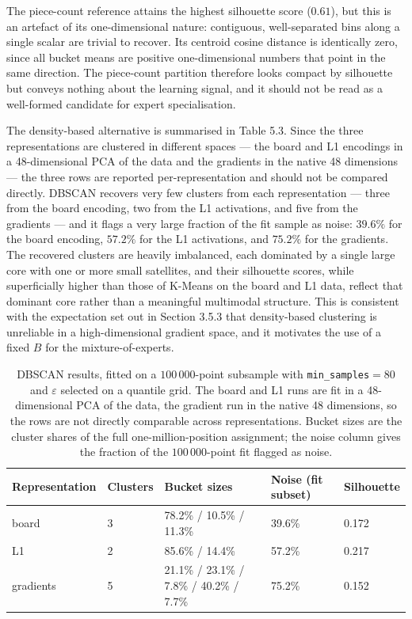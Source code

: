 The piece-count reference attains the highest silhouette score ($0.61$), but this is an artefact of its one-dimensional nature: contiguous, well-separated bins along a single scalar are trivial to recover. Its centroid cosine distance is identically zero, since all bucket means are positive one-dimensional numbers that point in the same direction. The piece-count partition therefore looks compact by silhouette but conveys nothing about the learning signal, and it should not be read as a well-formed candidate for expert specialisation.

The density-based alternative is summarised in Table 5.3. Since the three representations are clustered in different spaces --- the board and L1 encodings in a 48-dimensional PCA of the data and the gradients in the native 48 dimensions --- the three rows are reported per-representation and should not be compared directly. DBSCAN recovers very few clusters from each representation --- three from the board encoding, two from the L1 activations, and five from the gradients --- and it flags a very large fraction of the fit sample as noise: $39.6\%$ for the board encoding, $57.2\%$ for the L1 activations, and $75.2\%$ for the gradients. The recovered clusters are heavily imbalanced, each dominated by a single large core with one or more small satellites, and their silhouette scores, while superficially higher than those of K-Means on the board and L1 data, reflect that dominant core rather than a meaningful multimodal structure. This is consistent with the expectation set out in Section 3.5.3 that density-based clustering is unreliable in a high-dimensional gradient space, and it motivates the use of a fixed $B$ for the mixture-of-experts.

\begin{table}[H]
\centering
\caption{DBSCAN results, fitted on a $100\,000$-point subsample with \texttt{min\_samples}$=80$ and $\varepsilon$ selected on a quantile grid. The board and L1 runs are fit in a 48-dimensional PCA of the data, the gradient run in the native 48 dimensions, so the rows are not directly comparable across representations. Bucket sizes are the cluster shares of the full one-million-position assignment; the noise column gives the fraction of the $100\,000$-point fit flagged as noise.}
\small
\begin{tabular}{lllll}
\toprule
Representation & Clusters & Bucket sizes & Noise (fit subset) & Silhouette \\
\midrule
board & 3 & 78.2\% / 10.5\% / 11.3\% & 39.6\% & 0.172 \\
L1 & 2 & 85.6\% / 14.4\% & 57.2\% & 0.217 \\
gradients & 5 & 21.1\% / 23.1\% / 7.8\% / 40.2\% / 7.7\% & 75.2\% & 0.152 \\
\bottomrule
\end{tabular}
\end{table}


